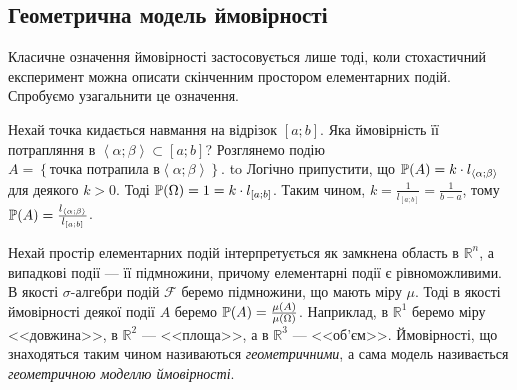 \subsection{Геометрична модель ймовірності}
Класичне означення ймовірності застосовується лише тоді, коли стохастичний експеримент можна описати скінченним простором елементарних подій.
Спробуємо узагальнити це означення.
\begin{example}
    Нехай точка кидається навмання на відрізок $\left[a; b\right]$. 
    Яка ймовірність її 
    потрапляння в $\left<\alpha; \beta\right> \subset  \left[a; b\right]$?
    Розглянемо подію $A = \left\{ 
        \text{точка потрапила в} \left<\alpha; \beta\right>
    \right\}$.
    \newline
    \hbox to 
    Логічно припустити, що $\P(A) = k\cdot l_{\left<\alpha; \beta\right>}$ для деякого $k > 0$.
    Тоді $\P(\Omega) = 1 = k\cdot l_{\left[a; b\right]}$. Таким чином, 
    $k = \frac{1}{l_{\left[a; b\right]}} = \frac{1}{b-a}$,
    тому $\P(A) = \frac{l_{\left<\alpha; \beta\right>}}{l_{\left[a; b\right]}}$.
\end{example}
\begin{definition}
    Нехай простір елементарних подій інтерпретується як замкнена область в 
    $ \mathbb{R} ^n$, а випадкові події --- її підмножини, причому елементарні події є рівноможливими. В якості $\sigma$-алгебри 
    подій $\mathcal{F}$ беремо підмножини, що мають міру $\mu$. Тоді в якості ймовірності 
    деякої події $A$ беремо $\P(A) = \frac{\mu(A)}{\mu(\Omega)}$. 
    Наприклад, в $\mathbb{R}^1$ беремо міру <<довжина>>, в $\mathbb{R}^2$ --- <<площа>>, а в $\mathbb{R}^3$ --- <<об'єм>>.
    Ймовірності, що знаходяться таким чином називаються \emph{геометричними}, а сама модель 
    називається \emph{геометричною моделлю ймовірності}.
    \end{definition}

